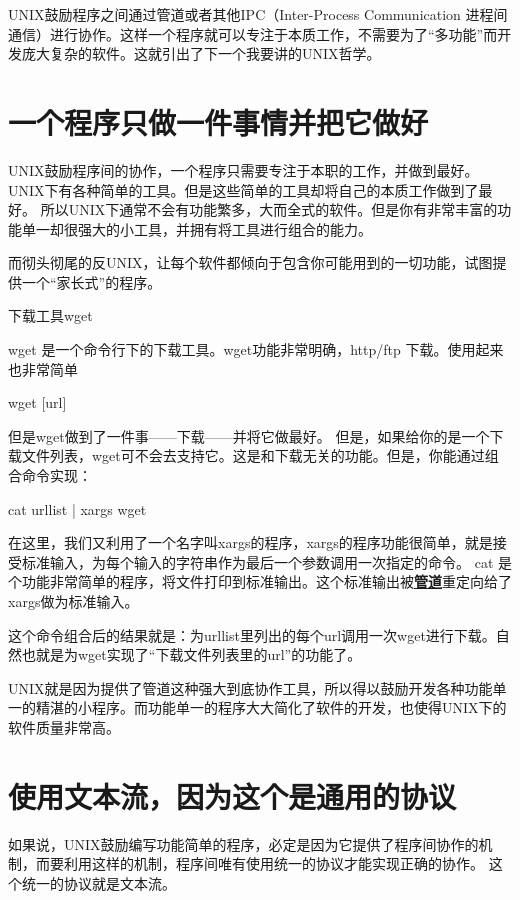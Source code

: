 UNIX鼓励程序之间通过管道或者其他IPC（Inter-Process Communication 进程间通信）进行协作。这样一个程序就可以专注于本质工作，不需要为了“多功能”而开发庞大复杂的软件。这就引出了下一个我要讲的UNIX哲学。

\section{一个程序只做一件事情并把它做好}

UNIX鼓励程序间的协作，一个程序只需要专注于本职的工作，并做到最好。UNIX下有各种简单的工具。但是这些简单的工具却将自己的本质工作做到了最好。
所以UNIX下通常不会有功能繁多，大而全式的软件。但是你有非常丰富的功能单一却很强大的小工具，并拥有将工具进行组合的能力。

而彻头彻尾的反UNIX，让每个软件都倾向于包含你可能用到的一切功能，试图提供一个“家长式”的程序。

\begin{example}{下载工具wget}

wget 是一个命令行下的下载工具。wget功能非常明确，http/ftp 下载。使用起来也非常简单
\begin{code}
wget [url]
\end{code}
但是wget做到了一件事——下载——并将它做最好。
但是，如果给你的是一个下载文件列表，wget可不会去支持它。这是和下载无关的功能。但是，你能通过组合命令实现：
\begin{code}
cat urllist | xargs wget
\end{code}
在这里，我们又利用了一个名字叫xargs的程序，xargs的程序功能很简单，就是接受标准输入，为每个输入的字符串作为最后一个参数调用一次指定的命令。
cat 是个功能非常简单的程序，将文件打印到标准输出。这个标准输出被\underline{\textbf{管道}}重定向给了xargs做为标准输入。

这个命令组合后的结果就是：为urllist里列出的每个url调用一次wget进行下载。自然也就是为wget实现了“下载文件列表里的url”的功能了。
\end{example}

UNIX就是因为提供了管道这种强大到底协作工具，所以得以鼓励开发各种功能单一的精湛的小程序。而功能单一的程序大大简化了软件的开发，也使得UNIX下的软件质量非常高。

\section{使用文本流，因为这个是通用的协议}

如果说，UNIX鼓励编写功能简单的程序，必定是因为它提供了程序间协作的机制，而要利用这样的机制，程序间唯有使用统一的协议才能实现正确的协作。
这个统一的协议就是文本流。

